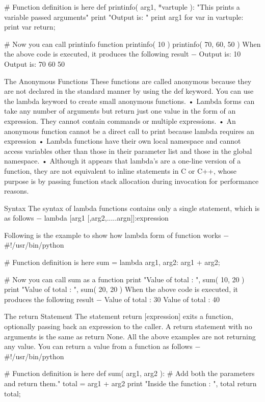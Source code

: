 	# Function definition is here
	def printinfo( arg1, *vartuple ):
	   "This prints a variable passed arguments"
	   print "Output is: "
	   print arg1
	   for var in vartuple:
	      print var
	   return;
	
	# Now you can call printinfo function
	printinfo( 10 )
	printinfo( 70, 60, 50 )
When the above code is executed, it produces the following result −
	Output is:
	10
	Output is:
	70
	60
	50

The Anonymous Functions
These functions are called anonymous because they are not declared in the standard manner by using the def keyword. You can use the lambda keyword to create small anonymous functions.
•	Lambda forms can take any number of arguments but return just one value in the form of an expression. They cannot contain commands or multiple expressions.
•	An anonymous function cannot be a direct call to print because lambda requires an expression
•	Lambda functions have their own local namespace and cannot access variables other than those in their parameter list and those in the global namespace.
•	Although it appears that lambda's are a one-line version of a function, they are not equivalent to inline statements in C or C++, whose purpose is by passing function stack allocation during invocation for performance reasons.

Syntax
The syntax of lambda functions contains only a single statement, which is as follows −
	lambda [arg1 [,arg2,.....argn]]:expression

Following is the example to show how lambda form of function works −
	#!/usr/bin/python

	# Function definition is here
	sum = lambda arg1, arg2: arg1 + arg2;

 

	# Now you can call sum as a function
	print "Value of total : ", sum( 10, 20 )
	print "Value of total : ", sum( 20, 20 )
When the above code is executed, it produces the following result −
	Value of total :  30
	Value of total :  40

The return Statement
The statement return [expression] exits a function, optionally passing back an expression to the caller. A return statement with no arguments is the same as return None.
All the above examples are not returning any value. You can return a value from a function as follows −
	#!/usr/bin/python

	# Function definition is here
	def sum( arg1, arg2 ):
	   # Add both the parameters and return them."
	   total = arg1 + arg2
	   print "Inside the function : ", total
	   return total;

